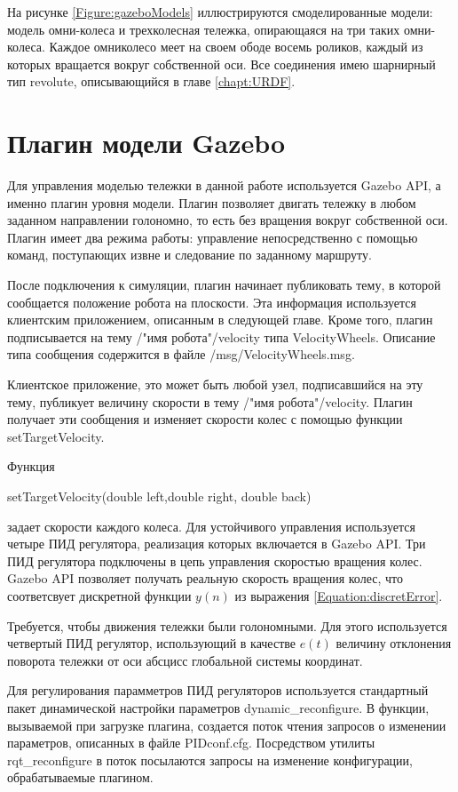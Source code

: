 \documentclass[oneside,final,14pt]{extreport}
\begin{document}
На рисунке \ref{Figure:gazeboModels} иллюстрируются смоделированные модели: модель омни-колеса и трехколесная тележка, опирающаяся на три таких омни-колеса. Каждое омниколесо меет на своем ободе восемь роликов, каждый из которых вращается вокруг собственной оси. Все соединения имею шарнирный тип revolute, описывающийся в главе \ref{chapt:URDF}.
\section{ Плагин модели Gazebo} 
Для управления моделью тележки в данной работе используется Gazebo API, а именно плагин уровня модели. Плагин позволяет двигать тележку в любом заданном направлении голономно, то есть без вращения вокруг собственной оси. Плагин имеет два режима работы: управление непосредственно с помощью команд, поступающих извне и следование по заданному маршруту. 

После подключения к симуляции, плагин начинает публиковать тему, в которой сообщается положение робота на плоскости. Эта информация используется клиентским приложением, описанным в следующей главе. 
Кроме того, плагин подписывается на тему /"имя робота"/velocity типа VelocityWheels. Описание типа сообщения содержится в файле /msg/VelocityWheels.msg. 

Клиентское приложение, это может быть любой узел, подписавшийся на эту тему, публикует величину скорости в тему  /"имя робота"/velocity. Плагин получает эти сообщения и изменяет скорости колес с помощью функции setTargetVelocity.

Функция  

setTargetVelocity(double left,double right, double back) 

задает скорости каждого колеса. Для устойчивого управления используется четыре ПИД регулятора, реализация которых включается в Gazebo API. Три ПИД регулятора подключены в цепь управления скоростью вращения колес. Gazebo API  позволяет получать реальную скорость вращения колес, что соответсвует дискретной функции $y(n)$ из выражения \ref{Equation:discretError}.  

Требуется, чтобы движения тележки  были голономными. Для этого используется четвертый ПИД регулятор, использующий в качестве $e(t)$ величину отклонения поворота тележки от оси абсцисс  глобальной системы координат.

Для регулирования парамметров ПИД регуляторов используется стандартный пакет динамической настройки параметров dynamic_reconfigure. В функции, вызываемой при загрузке плагина, создается поток чтения запросов о изменении параметров, описанных в файле PIDconf.cfg.  Посредством утилиты  rqt_reconfigure  в поток посылаются запросы на изменение конфигурации, обрабатываемые плагином. 
\end{document}

